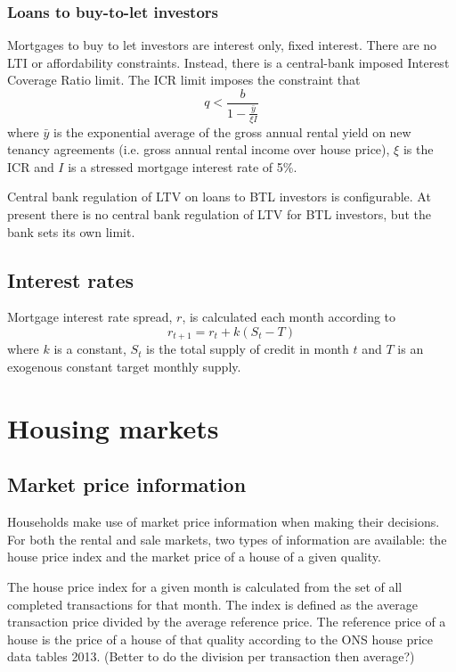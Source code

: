 \documentclass{report}
\begin{document}
\subsubsection{Loans to buy-to-let investors}
Mortgages to buy to let investors are interest only, fixed interest. There are no LTI or affordability constraints. Instead, there is a central-bank imposed Interest Coverage Ratio limit. The ICR limit imposes the constraint that
\begin{equation}
q < \frac{b}{1 - \frac{\bar{y}}{\xi I}}
\end{equation}
where $\bar{y}$ is the exponential average of the gross annual rental yield on new tenancy agreements (i.e. gross annual rental income over house price), $\xi$ is the ICR and $I$ is a stressed mortgage interest rate of 5\%.

Central bank regulation of LTV on loans to BTL investors is configurable. At present there is no central bank regulation of LTV for BTL investors, but the bank sets its own limit.

\subsection{Interest rates}
Mortgage interest rate spread, $r$, is calculated each month according to
\begin{equation}
r_{t+1} = r_{t} + k(S_t-T)
\label{spread}
\end{equation}
where $k$ is a constant, $S_t$ is the total supply of credit in month $t$ and $T$ is an exogenous constant target monthly supply.

\section{Housing markets}

\subsection{Market price information}

Households make use of market price information when making their decisions. For both the rental and sale markets, two types of information are available: the house price index and the market price of a house of a given quality.

The house price index for a given month is calculated from the set of all completed transactions for that month. The index is defined as the average transaction price divided by the average reference price. The reference price of a house is the price of a house of that quality according to the ONS house price data tables 2013. (Better to do the division per transaction then average?)
\end{document}
